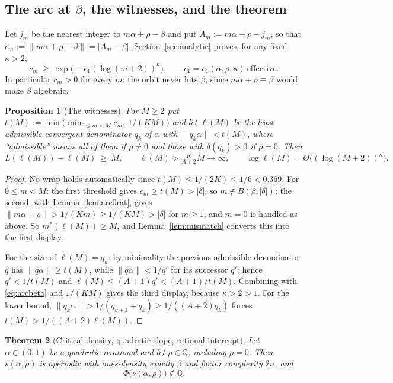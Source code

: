 \documentclass[11pt]{article}
\newtheorem{theorem}{Theorem}[section]
\newtheorem{proposition}[theorem]{Proposition}
\newcommand{\Q}{\mathbb{Q}}
\begin{document}
\subsection{The arc at $\beta$, the witnesses, and the theorem}

Let $j_m$ be the nearest integer to $m\alpha+\rho-\beta$ and put $A_m:=m\alpha+\rho-j_m$, so that
$c_m:=\lVert m\alpha+\rho-\beta\rVert=|A_m-\beta|$. Section~\ref{sec:analytic} proves, for any fixed
$\kappa>2$,
\begin{equation}
  c_m\ \ge\ \exp\bigl(-c_1(\log(m+2))^\kappa\bigr),\qquad c_1=c_1(\alpha,\rho,\kappa)\ \text{effective}.
  \label{eq:arcbeta}
\end{equation}
In particular $c_m>0$ for every $m$: the orbit never hits $\beta$, since $m\alpha+\rho\equiv\beta$
would make $\beta$ algebraic.

\begin{proposition}[The witnesses]
\label{prop:witness}
For $M\ge2$ put $t(M):=\min\bigl(\min_{0\le m<M}c_m,\ 1/(KM)\bigr)$ and let $\ell(M)$ be the least
admissible convergent denominator $q_k$ of $\alpha$ with $\lVert q_k\alpha\rVert<t(M)$, where
``admissible'' means all of them if $\rho\ne0$ and those with $\delta(q_k)>0$ if $\rho=0$. Then
\[
  L(\ell(M))-\ell(M)\ \ge\ M,\qquad
  \ell(M)>\tfrac{K}{A+2}M\to\infty,\qquad
  \log\ell(M)=O\bigl((\log(M+2))^\kappa\bigr).
\]
\end{proposition}

\begin{proof}
No-wrap holds automatically since $t(M)\le1/(2K)\le1/6<0.369$. For $0\le m<M$: the first threshold
gives $c_m\ge t(M)>|\delta|$, so $m\notin B(\beta,|\delta|)$; the second, with
Lemma~\ref{lem:arc0rat}, gives $\lVert m\alpha+\rho\rVert>1/(Km)\ge1/(KM)>|\delta|$ for $m\ge1$,
and $m=0$ is handled as above. So $m^*(\ell(M))\ge M$, and
Lemma~\ref{lem:mismatch} converts this into the first display.

For the size of $\ell(M)=q_k$: by minimality the previous admissible denominator $q$ has
$\lVert q\alpha\rVert\ge t(M)$, while $\lVert q\alpha\rVert<1/q'$ for its successor $q'$; hence
$q'<1/t(M)$ and $\ell(M)\le(A+1)q'<(A+1)/t(M)$. Combining with \eqref{eq:arcbeta} and
$1/(KM)$ gives the third display, because $\kappa>2>1$. For the lower bound,
$\lVert q_k\alpha\rVert>1/(q_{k+1}+q_k)\ge1/((A+2)q_k)$ forces $t(M)>1/((A+2)\ell(M))$.
\end{proof}

\begin{theorem}[Critical density, quadratic slope, rational intercept]
\label{thm:ratint}
Let $\alpha\in(0,1)$ be a quadratic irrational and let $\rho\in\Q$, including $\rho=0$. Then
$s(\alpha,\rho)$ is aperiodic with ones-density exactly $\beta$ and factor complexity $2n$, and
\[
  \Phi\bigl(s(\alpha,\rho)\bigr)\notin\Q .
\]
\end{theorem}
\end{document}
